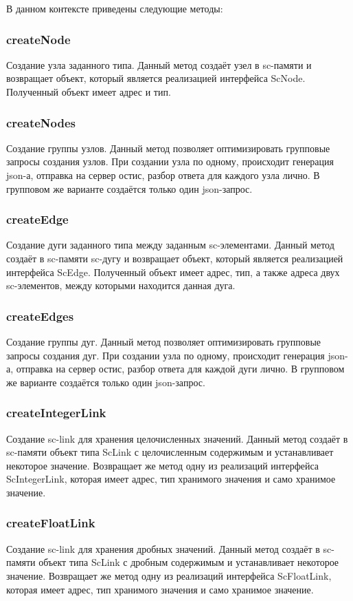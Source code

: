 В данном контексте приведены следующие методы:
\subsubsection{createNode} 
Создание узла заданного типа. Данный метод создаёт узел в sc-памяти и возвращает объект, который является реализацией интерфейса ScNode. Полученный объект имеет адрес и тип.

\subsubsection {createNodes} Создание группы узлов. Данный метод позволяет оптимизировать групповые запросы создания узлов. При создании узла по одному, происходит генерация json-а, отправка на сервер остис, разбор ответа для каждого узла лично. В групповом же варианте создаётся только один json-запрос. 
\subsubsection {createEdge} Создание дуги заданного типа между заданным sc-элементами. Данный метод создаёт в sc-памяти sc-дугу и возвращает объект, который является реализацией интерфейса ScEdge. Полученный объект имеет адрес, тип, а также адреса двух sc-элементов, между которыми находится данная дуга.
\subsubsection {createEdges} Создание группы дуг. Данный метод позволяет оптимизировать групповые запросы создания дуг. При создании узла по одному, происходит генерация json-а, отправка на сервер остис, разбор ответа для каждой дуги лично. В групповом же варианте создаётся только один json-запрос. 
\subsubsection {createIntegerLink} Создание sc-link для хранения целочисленных значений. Данный метод создаёт в sc-памяти объект типа ScLink с целочисленным содержимым и устанавливает некоторое значение. Возвращает же метод одну из реализаций интерфейса {ScIntegerLink}, которая имеет адрес, тип хранимого значения и само хранимое значение. 
\subsubsection {createFloatLink} Создание sc-link для хранения дробных значений. Данный метод создаёт в sc-памяти объект типа ScLink с дробным содержимым и устанавливает некоторое значение. Возвращает же метод одну из реализаций интерфейса ScFloatLink, которая имеет адрес, тип хранимого значения и само хранимое значение. 

